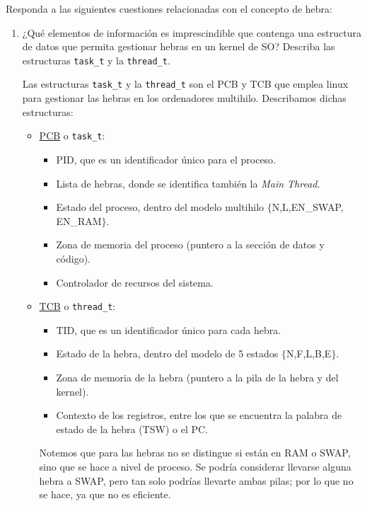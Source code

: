 \begin{ejercicio}
    Responda a las siguientes cuestiones relacionadas con el concepto de hebra:
    \begin{enumerate}
        \item ¿Qué elementos de información es imprescindible que contenga una estructura de datos que permita gestionar hebras en un kernel de SO? Describa las estructuras \verb|task_t| y la \verb|thread_t|.

        Las estructuras \verb|task_t| y la \verb|thread_t| son el PCB y TCB que emplea linux para gestionar las hebras en los ordenadores multihilo. Describamos dichas estructuras:
        \begin{itemize}
            \item \ul{PCB} o \verb|task_t|:
            \begin{itemize}
                \item PID, que es un identificador único para el proceso.
                \item Lista de hebras, donde se identifica también la \emph{Main Thread}.
                \item Estado del proceso, dentro del modelo multihilo $\{$N,L,EN\_SWAP, EN\_RAM$\}$.
                \item Zona de memoria del proceso (puntero a la sección de datos y código).
                \item Controlador de recursos del sistema.
            \end{itemize}

            \item \ul{TCB} o \verb|thread_t|:
            \begin{itemize}
                \item TID, que es un identificador único para cada hebra.
                \item Estado de la hebra, dentro del modelo de 5 estados $\{$N,F,L,B,E$\}$.
                \item Zona de memoria de la hebra (puntero a la pila de la hebra y del kernel).
                \item Contexto de los registros, entre los que se encuentra la palabra de estado de la hebra (TSW) o el PC.
            \end{itemize}

            Notemos que para las hebras no se distingue si están en RAM o SWAP, sino que se hace a nivel de proceso. Se podría considerar llevarse alguna hebra a SWAP, pero tan solo podrías llevarte ambas pilas; por lo que no se hace, ya que no es eficiente.
        \end{itemize}


\end{enumerate}
\end{ejercicio}
